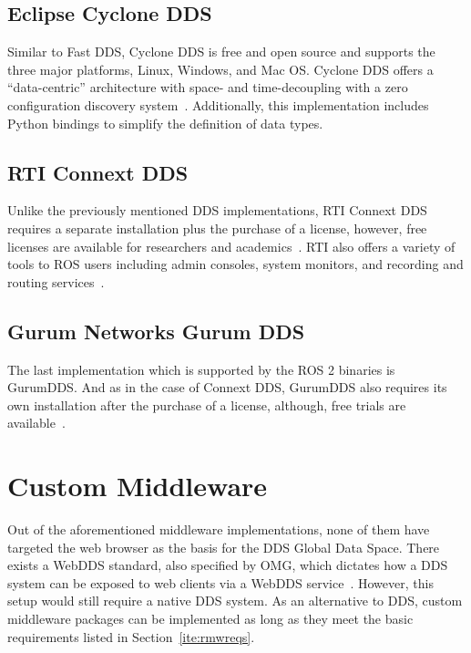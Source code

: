     \subsection{Eclipse Cyclone DDS}

        Similar to Fast \ac{DDS}, Cyclone \ac{DDS} is free and open source and supports the three major platforms, Linux, Windows, and Mac OS. Cyclone \ac{DDS} offers a ``data-centric'' architecture with space- and time-decoupling with a zero configuration discovery system~\cite{eclipse}. Additionally, this implementation includes Python bindings to simplify the definition of data types. 

    \subsection{RTI Connext DDS}

        Unlike the previously mentioned \ac{DDS} implementations, \ac{RTI} Connext DDS requires a separate installation plus the purchase of a license, however, free licenses are available for researchers and academics~\cite{connextuni}. \ac{RTI} also offers a variety of tools to \ac{ROS} users including admin consoles, system monitors, and recording and routing services~\cite{rtiblog}.

    \subsection{Gurum Networks Gurum DDS}

        The last implementation which is supported by the \ac{ROS} 2 binaries is GurumDDS. And as in the case of Connext DDS, GurumDDS also requires its own installation after the purchase of a license, although, free trials are available~\cite{gurum}. 


\section{Custom Middleware}

    Out of the aforementioned middleware implementations, none of them have targeted the web browser as the basis for the \ac{DDS} Global Data Space. There exists a \ac{WebDDS} standard, also specified by \ac{OMG}, which dictates how a \ac{DDS} system can be exposed to web clients via a \ac{WebDDS} service~\cite{webdds}. However, this setup would still require a native \ac{DDS} system. As an alternative to \ac{DDS}, custom middleware packages can be implemented as long as they meet the basic requirements listed in Section~\ref{ite:rmwreqs}.

